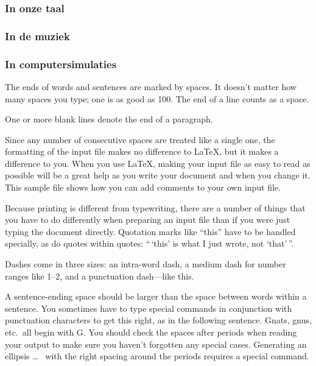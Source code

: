 \documentclass{article}      %
\begin{document}
\subsubsection{In onze taal}

\subsubsection{In de muziek}

\subsubsection{In computersimulaties}

The ends  of words and sentences are marked
  by   spaces. It  doesn't matter how many
spaces    you type; one is as good as 100.  The
end of   a line counts as a space.

One   or more   blank lines denote the  end
of  a paragraph.

Since any number of consecutive spaces are treated
like a single one, the formatting of the input
file makes no difference to
      \LaTeX,                %
but it makes a difference to you.  When you use
\LaTeX, making your input file as easy to read
as possible will be a great help as you write
your document and when you change it.  This sample
file shows how you can add comments to your own input
file.

Because printing is different from typewriting,
there are a number of things that you have to do
differently when preparing an input file than if
you were just typing the document directly.
Quotation marks like
       ``this''
have to be handled specially, as do quotes within
quotes:
       ``\,`this'            %
        is what I just
        wrote, not  `that'\,''.

Dashes come in three sizes: an
       intra-word
dash, a medium dash for number ranges like
       1--2,
and a punctuation
       dash---like
this.

A sentence-ending space should be larger than the
space between words within a sentence.  You
sometimes have to type special commands in
conjunction with punctuation characters to get
this right, as in the following sentence.
       Gnats, gnus, etc.\ all  %
       begin with G\@.         %
You should check the spaces after periods when
reading your output to make sure you haven't
forgotten any special cases.  Generating an
ellipsis
       \ldots\               %
with the right spacing around the periods requires
a special command.
\end{document}
